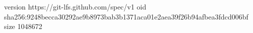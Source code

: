 version https://git-lfs.github.com/spec/v1
oid sha256:9248becca30292ae9b8973bab3b1371aca01e2aea39f26b94afbea3fdcd006bf
size 1048672
